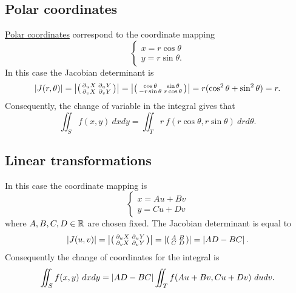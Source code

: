 \subsection*{Polar coordinates}
\href{https://en.wikipedia.org/wiki/Polar_coordinate_system}{Polar coordinates} correspond to the coordinate mapping
\[
    \begin{cases}
        x = r \cos \theta \\
        y = r \sin \theta.
    \end{cases}
\]
In this case the Jacobian determinant is
\[
    \left|J(r,\theta)\right|
    =
    \left|\left(\begin{smallmatrix}
            \partial_u X & \partial_u Y \\ \partial_v X & \partial_v Y
        \end{smallmatrix}\right)\right|
    =
    \left|\left(\begin{smallmatrix}
            \cos \theta & \sin \theta \\ -r\sin \theta & r\cos \theta
        \end{smallmatrix}\right)\right|
    = r ( \cos^2\theta + \sin^2 \theta) = r.
\]
Consequently, the change of variable in the integral gives that
\[
    \iint_{S} f(x,y) \ dx dy = \iint_{T}  r  \ f(r\cos \theta, r\sin \theta)  \ drd\theta.
\]


\subsection*{Linear transformations}
In this case the coordinate mapping is
\[
    \begin{cases}
        x = Au + Bv \\
        y = Cu + Dv
    \end{cases}
\]
where \(A,B,C,D \in \mathbb{R}\) are chosen fixed.
The Jacobian determinant is equal to
\[
    \left|J(u,v)\right|
    =
    \left|\left(\begin{smallmatrix}
            \partial_u X & \partial_u Y \\ \partial_v X & \partial_v Y
        \end{smallmatrix}\right)\right|
    =
    \left|\left(\begin{smallmatrix}
            A & B \\ C & D
        \end{smallmatrix}\right)\right|
    = \left|AD - BC\right|.
\]
Consequently the change of coordinates for the integral is
\[
    \iint_{S} f(x,y) \ dx dy = \left|AD - BC\right| \iint_{T}   f(Au + Bv,Cu + Dv)  \ du dv.
\]

